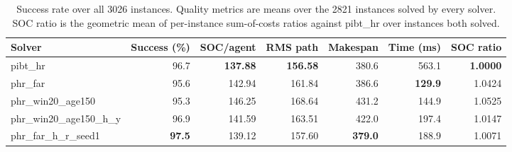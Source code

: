 \begin{table}[t]
\centering
\begin{tabular}{lrrrrrr}
\toprule
Solver & Success (\%) & SOC/agent & RMS path & Makespan & Time (ms) & SOC ratio \\
\midrule
pibt\_hr & 96.7 & \textbf{137.88} & \textbf{156.58} & 380.6 & 563.1 & \textbf{1.0000} \\
phr\_far & 95.6 & 142.94 & 161.84 & 386.6 & \textbf{129.9} & 1.0424 \\
phr\_win20\_age150 & 95.3 & 146.25 & 168.64 & 431.2 & 144.9 & 1.0525 \\
phr\_win20\_age150\_h\_y & 96.9 & 141.59 & 163.51 & 422.0 & 197.4 & 1.0147 \\
phr\_far\_h\_r\_seed1 & \textbf{97.5} & 139.12 & 157.60 & \textbf{379.0} & 188.9 & 1.0071 \\
\bottomrule
\end{tabular}
\caption{Success rate over all 3026 instances. Quality metrics are means over the 2821 instances solved by every solver. SOC ratio is the geometric mean of per-instance sum-of-costs ratios against pibt\_hr over instances both solved.}
\end{table}
